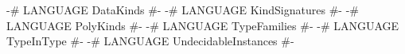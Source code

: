 \begin{code}
{-# LANGUAGE DataKinds              #-}
{-# LANGUAGE KindSignatures         #-}
{-# LANGUAGE PolyKinds              #-}
{-# LANGUAGE TypeFamilies           #-}
{-# LANGUAGE TypeInType             #-}
{-# LANGUAGE UndecidableInstances   #-}
\end{code}
